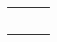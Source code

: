 \documentclass[12pt]{article}
\begin{document}
%
%
%
\begin{center}
	\begin{tabular}{M{12em}M{4cm}N}
		\parbox{12em}{\linespread{0.2}
			\xiaosi \bf \song	{}\\[0.1cm]
		}
		&  \yihao \hei {}&\\
	\end{tabular}
\end{center}
\end{document}

